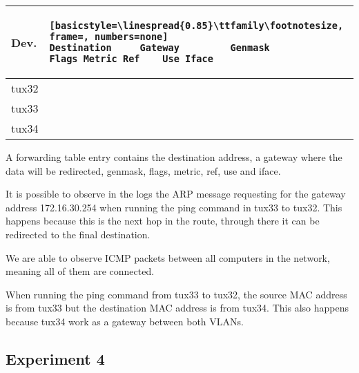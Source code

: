\documentclass[a4paper, 11pt]{report}
\begin{document}
\begin{center}
    \small
    \begin{tabular}{l | l}
        \textbf{Dev.} & \begin{lstlisting}[basicstyle=\linespread{0.85}\ttfamily\footnotesize, frame=, numbers=none]
Destination     Gateway         Genmask         Flags Metric Ref    Use Iface
            \end{lstlisting} \\ \hline
        tux32 &  \\ \hline
        tux33 &  \\ \hline
        tux34 & 
    \end{tabular}
\end{center}

A forwarding table entry contains the destination address, a gateway where the data will be redirected, genmask, flags, metric, ref, use and iface.

It is possible to observe in the logs the ARP message requesting for the gateway address 172.16.30.254 when running the ping command in tux33 to tux32.
This happens because this is the next hop in the route, through there it can be redirected to the final destination.

We are able to observe ICMP packets between all computers in the network, meaning all of them are connected.

When running the ping command from tux33 to tux32, the source MAC address is from tux33 but the destination MAC address is from tux34. This also happens because tux34
work as a gateway between both VLANs.

\subsection{Experiment 4} \label{sec:Exp4}
\end{document}
